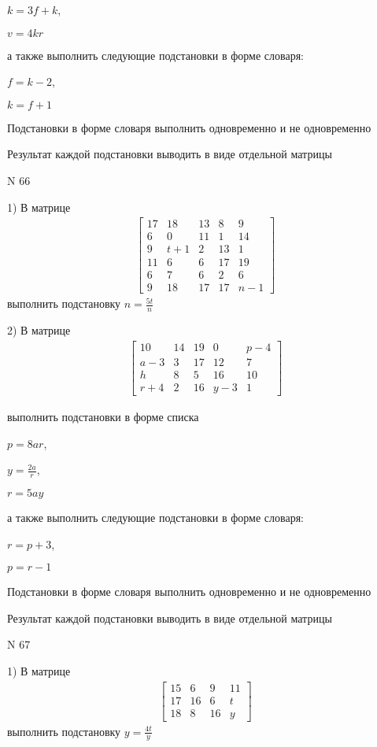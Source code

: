 \documentclass[11pt]{report}
\begin{document}
$k=3 f + k$,

$v=4 k r$

а также выполнить следующие подстановки в форме словаря:

$f=k - 2$,

$k=f + 1$


    Подстановки в форме словаря выполнить одновременно и не одновременно


    Результат каждой подстановки выводить в виде отдельной матрицы

\newpage
N 66


    1) В матрице
\begin{align*}
\left[\begin{matrix}17 & 18 & 13 & 8 & 9\\6 & 0 & 11 & 1 & 14\\9 & t + 1 & 2 & 13 & 1\\11 & 6 & 6 & 17 & 19\\6 & 7 & 6 & 2 & 6\\9 & 18 & 17 & 17 & n - 1\end{matrix}\right]
\end{align*}
выполнить подстановку $n=\frac{5 t}{n}$


    2) В матрице
\begin{align*}
\left[\begin{matrix}10 & 14 & 19 & 0 & p - 4\\a - 3 & 3 & 17 & 12 & 7\\h & 8 & 5 & 16 & 10\\r + 4 & 2 & 16 & y - 3 & 1\end{matrix}\right]
\end{align*}

выполнить подстановки в форме списка

$p=8 a r$,

$y=\frac{2 a}{r}$,

$r=5 a y$

а также выполнить следующие подстановки в форме словаря:

$r=p + 3$,

$p=r - 1$


    Подстановки в форме словаря выполнить одновременно и не одновременно


    Результат каждой подстановки выводить в виде отдельной матрицы

\newpage
N 67


    1) В матрице
\begin{align*}
\left[\begin{matrix}15 & 6 & 9 & 11\\17 & 16 & 6 & t\\18 & 8 & 16 & y\end{matrix}\right]
\end{align*}
выполнить подстановку $y=\frac{4 t}{y}$
\end{document}
